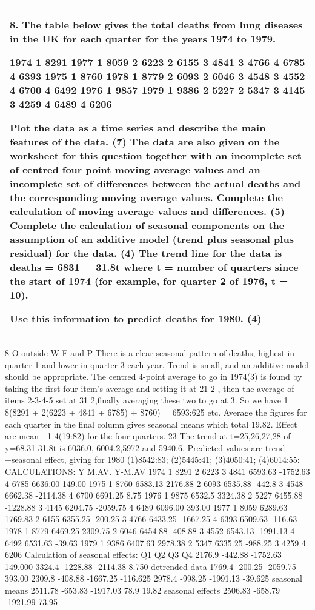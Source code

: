 \documentclass[a4paper,12pt]{article}
\begin{document}
\begin{table}[ht!]
 \centering
 \begin{tabular}{|p{15cm}|}
 \hline  
8. The table below gives the total deaths from lung diseases in the UK for each quarter for the years 1974 to 1979.  
 
1974   1 8291 1977 1 8059  2 6223  2 6155  3 4841  3 4766  4 6785  4 6393 1975 1 8760 1978 1 8779  2 6093  2 6046  3 4548  3 4552  4 6700  4 6492 1976 1 9857 1979 1 9386  2 5227  2 5347  3 4145  3 4259  4 6489  4 6206 
 
Plot the data as a time series and describe the main features of the data. 
(7) The data are also given on the worksheet for this question together with an incomplete set of centred four point moving average values and an incomplete set of differences between the actual deaths and the corresponding moving average values.  Complete the calculation of moving average values and differences. (5) Complete the calculation of seasonal components on the assumption of an additive model (trend plus seasonal plus residual) for the data. (4) The trend line for the data is deaths = 6831 − 31.8t where t = number of quarters since the start of 1974 (for example, for quarter 2 of 1976, t = 10). 
 
Use this information to predict deaths for 1980. 
(4) \\ \hline
  \end{tabular}
\end{table}
\begin{enumerate}8
O outside W F and P
There is a clear seasonal pattern of deaths, highest in quarter 1 and lower in quarter
3 each year. Trend is small, and an additive model should be appropriate.
The centred 4-point average to go in 1974(3) is found by taking the first four item’s
average and setting it at 21
2 , then the average of items 2-3-4-5 set at 31
2,finally averaging
these two to go at 3. So we have 1
8(8291 + 2(6223 + 4841 + 6785) + 8760) = 6593:625
etc. Average the figures for each quarter in the final column gives seasonal means which
total 19.82. Effect are mean - 1
4(19:82) for the four quarters.
23
The trend at t=25,26,27,28 of y=68.31-31.8t is 6036.0, 6004.2,5972 and 5940.6. Predicted
values are trend +seasonal effect, giving for
1980 (1)8542:83; (2)5445:41; (3)4050:41; (4)6014:55:
CALCULATIONS:
Y M.AV. Y-M.AV
1974 1 8291
2 6223
3 4841 6593.63 -1752.63
4 6785 6636.00 149.00
1975 1 8760 6583.13 2176.88
2 6093 6535.88 -442.8
3 4548 6662.38 -2114.38
4 6700 6691.25 8.75
1976 1 9875 6532.5 3324.38
2 5227 6455.88 -1228.88
3 4145 6204.75 -2059.75
4 6489 6096.00 393.00
1977 1 8059 6289.63 1769.83
2 6155 6355.25 -200.25
3 4766 6433.25 -1667.25
4 6393 6509.63 -116.63
1978 1 8779 6469.25 2309.75
2 6046 6454.88 -408.88
3 4552 6543.13 -1991.13
4 6492 6531.63 -39.63
1979 1 9386 6407.63 2978.38
2 5347 6335.25 -988.25
3 4259
4 6206
Calculation of seasonal effects:
Q1 Q2 Q3 Q4
2176.9 -442.88 -1752.63 149.000
3324.4 -1228.88 -2114.38 8.750
detrended data 1769.4 -200.25 -2059.75 393.00
2309.8 -408.88 -1667.25 -116.625
2978.4 -998.25 -1991.13 -39.625
seasonal means 2511.78 -653.83 -1917.03 78.9 19.82
seasonal effects 2506.83 -658.79 -1921.99 73.95
\end{enumerate}
\end{document}
